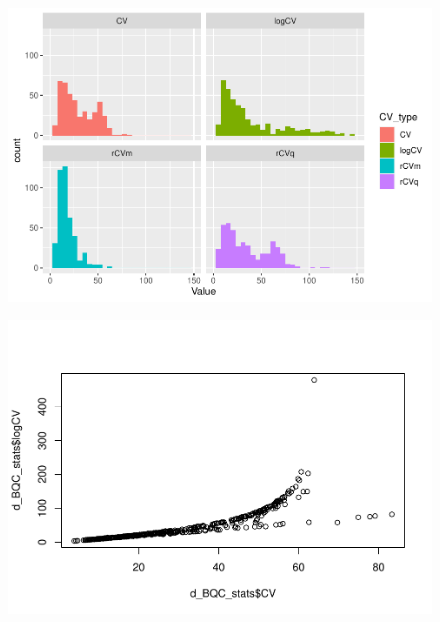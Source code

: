 \documentclass[
  letterpaper,
  DIV=11,
  numbers=noendperiod]{scrreprt}
\newenvironment{Shaded}{\begin{snugshade}}{\end{snugshade}}
\newcommand{\FunctionTok}[1]{\textcolor[rgb]{0.28,0.35,0.67}{#1}}
\newcommand{\NormalTok}[1]{\textcolor[rgb]{0.00,0.23,0.31}{#1}}
\newcommand{\SpecialCharTok}[1]{\textcolor[rgb]{0.37,0.37,0.37}{#1}}
\begin{document}
\begin{figure}[H]

{\centering \includegraphics{./datawrangling_files/figure-pdf/calulcate-column-stats-4.pdf}

}

\end{figure}

\begin{Shaded}
\end{Shaded}

\begin{figure}[H]

{\centering \includegraphics{./datawrangling_files/figure-pdf/calulcate-column-stats-5.pdf}

}

\end{figure}
\end{document}
